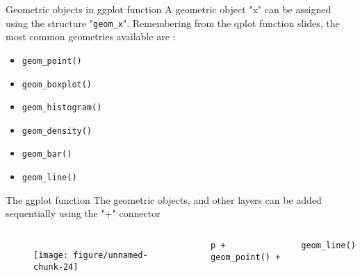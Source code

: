 \documentclass{beamer}\usepackage[]{graphicx}\usepackage[]{color}
\makeatletter
\def\maxwidth{ %
  \ifdim\Gin@nat@width>\linewidth
    \linewidth
  \else
    \Gin@nat@width
  \fi
}
\newenvironment{knitrout}{}{} %
\makeatother
\begin{document}
\begin{frame}[containsverbatim]{Geometric objects in ggplot function}
A geometric object "x" can be assigned using the structure "\texttt{geom\_x}". Remembering from the qplot function slides, the most common geometries available are : 
\begin{itemize}
\item \texttt{geom\_point()}
\item \texttt{geom\_boxplot()}
\item \texttt{geom\_histogram()}
\item \texttt{geom\_density()}
\item \texttt{geom\_bar()}
\item \texttt{geom\_line()}
\end{itemize}
\end{frame}

\begin{frame}[containsverbatim]{The ggplot function}
The geometric objects, and other layers can be added sequentially using the "+" connector
\begin{columns}[t] 
\begin{minipage}{1\textwidth}
\begin{figure}[t]
\centering
\begin{knitrout}\footnotesize
{}\color{fgcolor}
\texttt{[image: figure/unnamed-chunk-24]} 

\end{knitrout}
\end{figure}
 \end{minipage}
\begin{minipage}{1\textwidth}

\texttt{p + geom\_point() +}

\texttt{geom\_line()}

\end{minipage}
\end{columns}
\end{frame}
\end{document}
